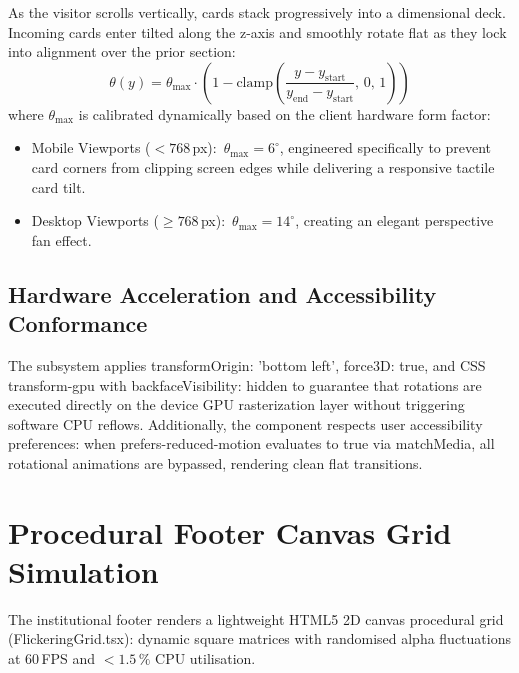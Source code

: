 \documentclass[12pt, a4paper, oneside]{report}
\def\textbf#1{#1}
\def\texttt#1{#1}
\begin{document}
As the visitor scrolls vertically, cards stack progressively into a dimensional deck.
Incoming cards enter tilted along the z-axis and smoothly rotate flat as they lock into
alignment over the prior section:
\begin{equation}
  \theta(y) = \theta_{\max} \cdot \left(1 - \text{clamp}\!\left(\frac{y - y_{\text{start}}}{y_{\text{end}} - y_{\text{start}}},\, 0,\, 1\right)\right)
\end{equation}
where $\theta_{\max}$ is calibrated dynamically based on the client hardware form factor:
\begin{itemize}
  \item \textbf{Mobile Viewports ($< 768$\,px):}\ $\theta_{\max} = 6^\circ$, engineered
        specifically to prevent card corners from clipping screen edges while delivering
        a responsive tactile card tilt.
  \item \textbf{Desktop Viewports ($\geq 768$\,px):}\ $\theta_{\max} = 14^\circ$, creating
        an elegant perspective fan effect.
\end{itemize}

\subsection{Hardware Acceleration and Accessibility Conformance}

The subsystem applies \texttt{transformOrigin: 'bottom left'}, \texttt{force3D: true},
and CSS \texttt{transform-gpu} with \texttt{backfaceVisibility: hidden} to guarantee that
rotations are executed directly on the device GPU rasterization layer without triggering
software CPU reflows.  Additionally, the component respects user accessibility preferences:
when \texttt{prefers-reduced-motion} evaluates to true via \texttt{matchMedia},
all rotational animations are bypassed, rendering clean flat transitions.

\section{Procedural Footer Canvas Grid Simulation}

The institutional footer renders a lightweight HTML5 2D canvas procedural grid
(\texttt{FlickeringGrid.tsx}): dynamic square matrices with randomised alpha
fluctuations at 60\,FPS and ${<}1.5\,\%$ CPU utilisation.

\end{document}
